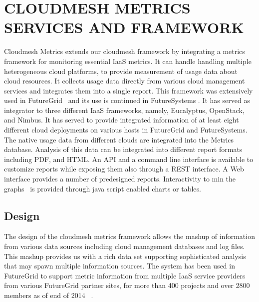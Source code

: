 \documentclass{sig-alternate-05-2015}
\newcommand{\hyungro}[1]{\todo[inline, color=green!20]{Hyungro:~#1}}
\begin{document}
\hyungro{describe what xras is}
\cite{hart2014xras}

\section{CLOUDMESH METRICS SERVICES AND FRAMEWORK}\label{S:cloudmesh}

Cloudmesh Metrics extends our cloudmesh framework \cite{las14cloudmeshmultiple}
by integrating a metrics framework for monitoring essential IaaS metrics. It
can handle handling multiple heterogeneous cloud platforms, to provide
measurement of usage data about cloud resources.  It collects usage data
directly from various cloud management services and integrates them into a
single report. This framework was extensively used in
FutureGrid~\cite{las2010gce,las12fg-bookchapter} and its use is continued in
FutureSystems \cite{??}. It has served as integrator to three different IaaS
frameworks, namely, Eucalyptus, OpenStack, and Nimbus. It has served to provide
integrated information of at least eight different cloud deployments on various
hosts in FutureGrid and FutureSystems.  The native usage data from different
clouds are integrated into the Metrics database. Analysis of this data can be
integrated into different report formats including PDF, and HTML. An API and a
command line interface is available to customize reports while exposing them
also through a REST interface. A Web interface provides a number of predesigned
reports. Interactivity to min the graphs~\cite{highsoft2012highcharts} is
provided through java script enabled charts or tables.

\subsection{Design}

The design of the cloudmesh metrics framework allows the mashup of
information from various data sources including cloud management
databases and log files. This mashup provides us with a rich
data set supporting sophisticated analysis that may spawn multiple
information sources.
The system has been used in FutureGrid to support metric
information from multiple IaaS service providers from various 
FutureGrid partner sites, for more than 400 projects and over 
2800 members as of end of 2014 ~\cite{las14cloudmeshmultiple}.
\end{document}
